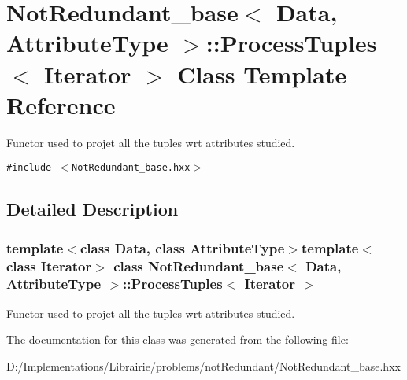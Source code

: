 \section{Not\-Redundant\_\-base$<$ Data, Attribute\-Type $>$::Process\-Tuples$<$ Iterator $>$ Class Template Reference}
\label{class_not_redundant__base_1_1_process_tuples}
Functor used to projet all the tuples wrt attributes studied.  


{\tt \#include $<$Not\-Redundant\_\-base.hxx$>$}



\subsection{Detailed Description}
\subsubsection*{template$<$class Data, class Attribute\-Type$>$template$<$class Iterator$>$ class Not\-Redundant\_\-base$<$ Data, Attribute\-Type $>$::Process\-Tuples$<$ Iterator $>$}

Functor used to projet all the tuples wrt attributes studied. 



The documentation for this class was generated from the following file:\begin{CompactItemize}
\item 
D:/Implementations/Librairie/problems/not\-Redundant/Not\-Redundant\_\-base.hxx\end{CompactItemize}
